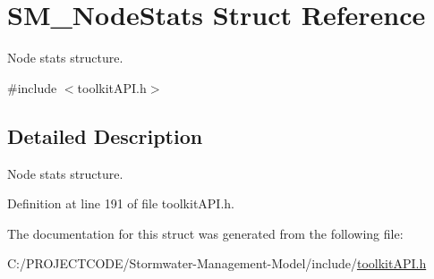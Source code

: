 \hypertarget{struct_s_m___node_stats}{}\section{S\+M\+\_\+\+Node\+Stats Struct Reference}
\label{struct_s_m___node_stats}


Node stats structure.  




{\ttfamily \#include $<$toolkit\+A\+P\+I.\+h$>$}



\subsection{Detailed Description}
Node stats structure. 

Definition at line 191 of file toolkit\+A\+P\+I.\+h.



The documentation for this struct was generated from the following file\+:\begin{DoxyCompactItemize}
\item 
C\+:/\+P\+R\+O\+J\+E\+C\+T\+C\+O\+D\+E/\+Stormwater-\/\+Management-\/\+Model/include/\hyperlink{toolkit_a_p_i_8h}{toolkit\+A\+P\+I.\+h}\end{DoxyCompactItemize}
